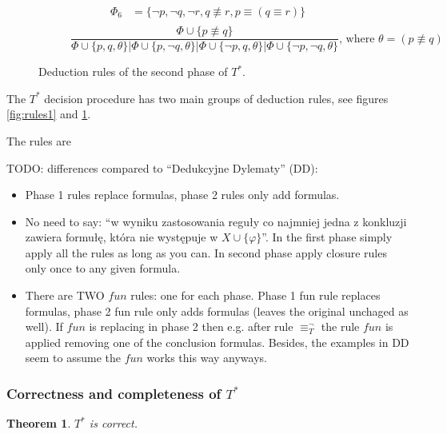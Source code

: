\documentclass{article}
\newtheorem{theorem}{Theorem}
\theoremstyle{definition}
\newcommand*{\Ts}{T^*}
\newcommand*{\id}{\equiv}
\begin{document}
\begin{figure}
\begin{subfigure}{\textwidth}
\[\begin{aligned}
                \Phi_6 & = \{\lnot p, \lnot q,\lnot r, q \not \id r, p \id (q \id r) \} \\
            \end{aligned}
        \]
        \begin{equation}
            \tag{$\eq_\bot$}
            \frac{
                \Phi \cup \{ p \not \id q \} }%
            { \Phi \cup \{p,q,\theta\} |
                \Phi \cup \{p,\lnot q,\theta\} |
                \Phi \cup \{\lnot p,q,\theta\} |
                \Phi \cup \{\lnot p,\lnot q,\theta\}
            }
            \text{, where } \theta = (p \not \id q)
        \end{equation}
    \end{subfigure}
    \caption{Deduction rules of the second phase of $\Ts$.}
    \label{fig:rules2}
\end{figure}

The $\Ts$ decision procedure has two main groups of deduction rules, see figures \ref{fig:rules1} and \ref{fig:rules2}.

The rules are

TODO: differences compared to \enquote{Dedukcyjne Dylematy} (DD):
\begin{itemize}
    \item Phase 1 rules replace formulas, phase 2 rules only add formulas.
    \item No need to say: \enquote{w wyniku zastosowania reguły co najmniej jedna z konkluzji zawiera formułę, która nie występuje w $X \cup \{\varphi\}$}. In the first phase simply apply all the rules as long as you can. In second phase apply closure rules only once to any given formula.
    \item There are TWO $fun$ rules: one for each phase. Phase 1 fun rule replaces formulas, phase 2 fun rule only adds formulas (leaves the original unchaged as well). If $fun$ is replacing in phase 2 then e.g. after rule $\equiv_T^\lnot$ the rule $fun$ is applied removing one of the conclusion formulas. Besides, the examples in DD seem to assume the $fun$ works this way anyways.
\end{itemize}

\subsubsection{Correctness and completeness of $\Ts$}
\begin{theorem}
    $\Ts$ is correct.
\end{theorem}
\end{document}
